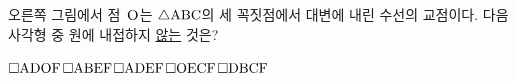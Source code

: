 \noindent\begin{minipage}[t]{0.58\linewidth}\vspace{0pt}\raggedright 오른쪽 그림에서 점~$\mathrm{O}$는 $\triangle\mathrm{ABC}$의 세 꼭짓점에서 대변에 내린 수선의 교점이다. 다음 사각형 중 원에 내접하지 \underline{않는} 것은?\end{minipage}\hfill\begin{minipage}[t]{0.4\linewidth}\vspace{0pt}\centering \resizebox{\ifdim\width>\linewidth\linewidth\else\width\fi}{!}{}\end{minipage}\par
\begin{choices32}{$\square\mathrm{ADOF}$}{$\square\mathrm{ABEF}$}{$\square\mathrm{ADEF}$}{$\square\mathrm{OECF}$}{$\square\mathrm{DBCF}$}\end{choices32}
